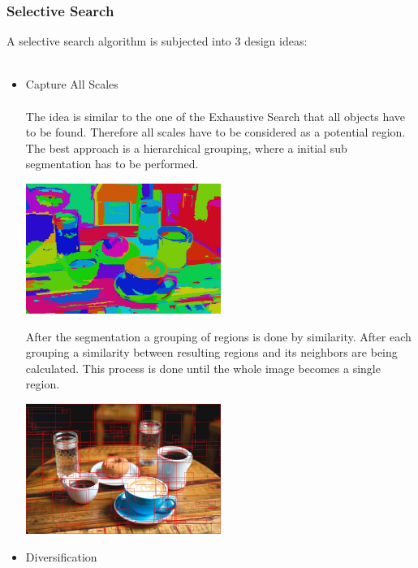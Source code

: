 \subsubsection{Selective Search}
A selective search algorithm is subjected into 3 design ideas:\\ \\
\begin{itemize}
    \item Capture All Scales \\ \\
        The idea is similar to the one of the Exhaustive Search that all objects have to be found. Therefore all scales have to be
        considered as a potential region. The best approach is a hierarchical grouping, where a initial sub segmentation has to
        be performed. \cite{selectivesearch}
        \begin{center}
            \includegraphics[width=0.5\textwidth]{images/object_detection/breakfast_fnh.jpg}\cite{sssegmentationc}
        \end{center}
        After the segmentation a grouping of regions is done by similarity. After each grouping a similarity between
        resulting regions and its neighbors are being calculated. This process is done until the whole image becomes a single region.\cite{selectivesearch}
        \begin{center}
            \includegraphics[width=0.5\textwidth]{images/object_detection/breakfast-top-200-proposals.jpg}\cite{sssegmentationbb}
        \end{center}
    \item Diversification \\ \\

\end{itemize}
